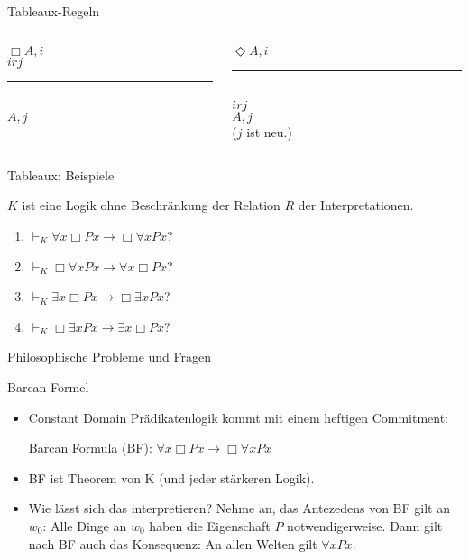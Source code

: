\documentclass[12pt]{beamer}
\newcommand{\prule}{\vspace{-8pt}\rule{50pt}{0.5pt}}
\begin{document}
\begin{frame}{Tableaux-Regeln}
  \begin{columns}
    \begin{column}[t]{.5 \linewidth}
      \begin{center}
        $\Box A, i$ \\
        $irj$ \\
        \prule \\
        $A, j$
      \end{center}
    \end{column}
    \begin{column}[t]{.5 \linewidth}
      \begin{center}
        $\Diamond A, i$\\
        \prule \\
        $irj$ \\
        $A,j$ \\
        ($j$ ist neu.)
      \end{center}

    \end{column}
  \end{columns}

  
\end{frame}



\begin{frame}{Tableaux: Beispiele}

$K$ ist eine Logik ohne Beschränkung der Relation $R$ der Interpretationen.
  \begin{enumerate}[<+->]
  \item   $\vdash_K \forall x \Box Px \to \Box \forall x Px$? 
  \item $\vdash_K \Box \forall x Px \to \forall x \Box Px$?
  \item $\vdash_K \exists x \Box Px \to \Box \exists x Px$?
  \item $\vdash_K \Box \exists x Px \to \exists x \Box Px$?
  \end{enumerate}


\end{frame}


\begin{frame}
  \Huge Philosophische Probleme und Fragen
\end{frame}

\begin{frame}{Barcan-Formel}

  \begin{itemize}[<+->]
  \item Constant Domain Prädikatenlogik kommt mit einem heftigen Commitment:
    \begin{center}
       Barcan Formula (BF): $\forall x \Box Px \to \Box \forall x Px$
    \end{center}
  \item BF ist Theorem von K (und jeder stärkeren Logik).
  \item Wie lässt sich das interpretieren? Nehme an, das Antezedens von BF gilt an $w_0$: Alle Dinge an $w_0$ haben die Eigenschaft $P$ notwendigerweise. Dann gilt nach BF auch das Konsequenz: An allen Welten gilt $\forall x Px$. 
  \end{itemize}
  
\end{frame}
\end{document}
